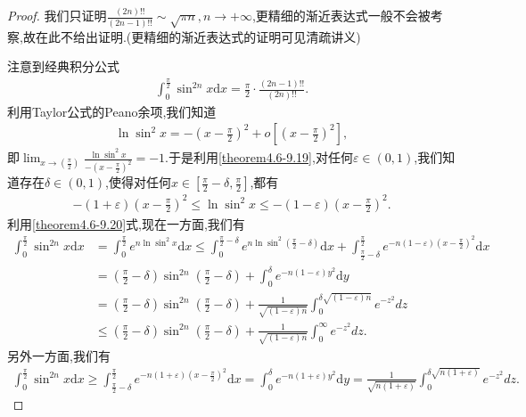 \documentclass[../../main.tex]{subfiles}
\begin{document}
\begin{proof}
我们只证明$\frac{(2n)!!}{(2n-1)!!}\sim \sqrt{\pi n},n\rightarrow +\infty$,更精细的渐近表达式一般不会被考察,故在此不给出证明.(更精细的渐近表达式的证明可见清疏讲义)

注意到经典积分公式
\begin{align}\label{theorem4.6-1.1}
\int_{0}^{\frac{\pi}{2}}\sin^{2n}x \mathrm{d}x=\frac{\pi}{2}\cdot\frac{(2n - 1)!!}{(2n)!!}.
\end{align}
利用Taylor公式的Peano余项,我们知道
\begin{align}\label{theorem4.6-9.19}
\ln\sin^{2}x=-\left(x - \frac{\pi}{2}\right)^{2}+o\left[\left(x - \frac{\pi}{2}\right)^{2}\right],
\end{align}
即\(\lim_{x\rightarrow(\frac{\pi}{2})}\frac{\ln\sin^{2}x}{-(x - \frac{\pi}{2})^{2}}=-1\).于是利用\eqref{theorem4.6-9.19},对任何\(\varepsilon\in(0,1)\),我们知道存在\(\delta\in(0,1)\),使得对任何\(x\in[\frac{\pi}{2}-\delta,\frac{\pi}{2}]\),都有
\begin{align}\label{theorem4.6-9.20}
-(1 + \varepsilon)\left(x - \frac{\pi}{2}\right)^{2}\leqslant\ln\sin^{2}x\leqslant-(1 - \varepsilon)\left(x - \frac{\pi}{2}\right)^{2}.
\end{align}
利用\eqref{theorem4.6-9.20}式,现在一方面,我们有
\begin{align*}
\int_{0}^{\frac{\pi}{2}}\sin^{2n}x \mathrm{d}x&=\int_{0}^{\frac{\pi}{2}}e^{n\ln\sin^{2}x}\mathrm{d}x
\leqslant\int_{0}^{\frac{\pi}{2}-\delta}e^{n\ln\sin^{2}(\frac{\pi}{2}-\delta)}\mathrm{d}x+\int_{\frac{\pi}{2}-\delta}^{\frac{\pi}{2}}e^{-n(1 - \varepsilon)(x - \frac{\pi}{2})^{2}}\mathrm{d}x\\
&=(\frac{\pi}{2}-\delta)\sin^{2n}(\frac{\pi}{2}-\delta)+\int_{0}^{\delta}e^{-n(1 - \varepsilon)y^{2}}\mathrm{d}y\\
&=(\frac{\pi}{2}-\delta)\sin^{2n}(\frac{\pi}{2}-\delta)+\frac{1}{\sqrt{(1 - \varepsilon)n}}\int_{0}^{\delta\sqrt{(1 - \varepsilon)n}}e^{-z^{2}}dz\\
&\leqslant(\frac{\pi}{2}-\delta)\sin^{2n}(\frac{\pi}{2}-\delta)+\frac{1}{\sqrt{(1 - \varepsilon)n}}\int_{0}^{\infty}e^{-z^{2}}dz.
\end{align*}
另外一方面,我们有
\begin{align*}
\int_{0}^{\frac{\pi}{2}}\sin^{2n}x \mathrm{d}x\geqslant\int_{\frac{\pi}{2}-\delta}^{\frac{\pi}{2}}e^{-n(1 + \varepsilon)(x - \frac{\pi}{2})^{2}}\mathrm{d}x
=\int_{0}^{\delta}e^{-n(1 + \varepsilon)y^{2}}\mathrm{d}y
=\frac{1}{\sqrt{n(1 + \varepsilon)}}\int_{0}^{\delta\sqrt{n(1 + \varepsilon)}}e^{-z^{2}}dz.

\end{align*}
\end{proof}
\end{document}
